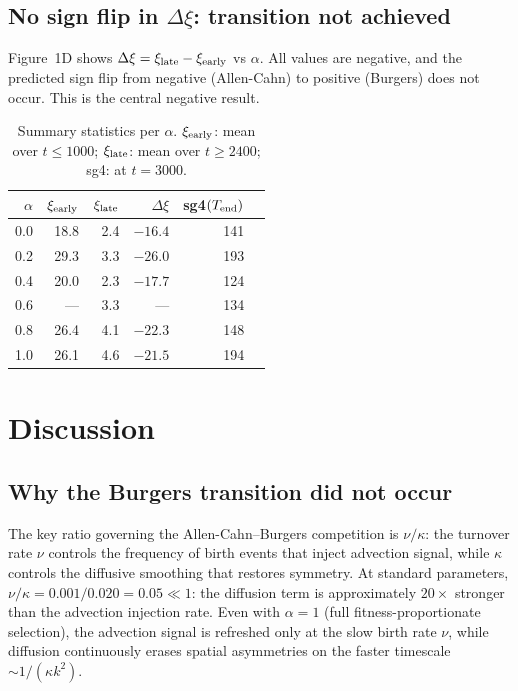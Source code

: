 \documentclass[11pt]{article}
\begin{document}
\subsection{No sign flip in $\Delta\xi$: transition not achieved}

Figure~1D shows $\Delta\xi = \xi_{\rm late} - \xi_{\rm early}$ vs $\alpha$.
All values are negative, and the predicted sign flip from negative
(Allen-Cahn) to positive (Burgers) does not occur.
This is the central negative result.

\begin{table}[ht]
\centering
\caption{Summary statistics per $\alpha$. $\xi_{\rm early}$: mean over
$t \leq 1000$; $\xi_{\rm late}$: mean over $t \geq 2400$; sg4: at $t=3000$.}
\label{tab:results}
\begin{tabular}{rrrrrr}
\toprule
$\alpha$ & $\xi_{\rm early}$ & $\xi_{\rm late}$ & $\Delta\xi$ & sg4$(T_{\rm end})$ \\
\midrule
0.0  & 18.8 & 2.4 & $-16.4$ & 141 \\
0.2  & 29.3 & 3.3 & $-26.0$ & 193 \\
0.4  & 20.0 & 2.3 & $-17.7$ & 124 \\
0.6  & ---  & 3.3 & --- & 134 \\
0.8  & 26.4 & 4.1 & $-22.3$ & 148 \\
1.0  & 26.1 & 4.6 & $-21.5$ & 194 \\
\bottomrule
\end{tabular}
\end{table}

\section{Discussion}

\subsection{Why the Burgers transition did not occur}

The key ratio governing the Allen-Cahn--Burgers competition is
$\nu/\kappa$: the turnover rate $\nu$ controls the frequency of birth
events that inject advection signal, while $\kappa$ controls the diffusive
smoothing that restores symmetry.
At standard parameters, $\nu/\kappa = 0.001/0.020 = 0.05 \ll 1$: the
diffusion term is approximately $20\times$ stronger than the advection
injection rate.
Even with $\alpha=1$ (full fitness-proportionate selection), the advection
signal is refreshed only at the slow birth rate $\nu$, while diffusion
continuously erases spatial asymmetries on the faster timescale
$\sim 1/(\kappa k^2)$.
\end{document}
